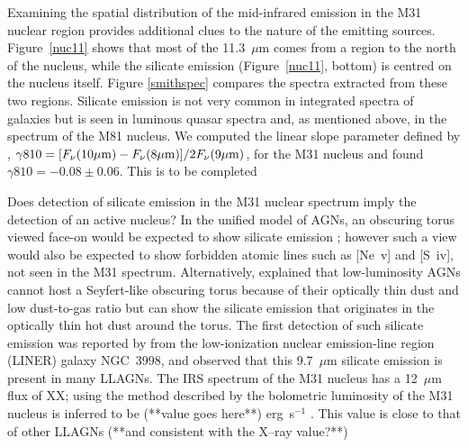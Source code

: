 Examining the spatial distribution of the mid-infrared emission in the M31 nuclear region provides additional clues
to the nature of the emitting sources. Figure~\ref{nuc11} shows that most of the 11.3~$\mu$m comes from a region to the
north of the nucleus, while the silicate emission (Figure~\ref{nuc11},  bottom) is centred on the nucleus itself.  
Figure \ref{smithspec} compares the spectra extracted from these two regions. %
Silicate emission is not very common in
integrated spectra of galaxies \citep{Spoon2007} but is seen in luminous quasar spectra \citep{Hill14} and, as mentioned above, in the
spectrum of the M81 nucleus. We computed the linear slope parameter  defined by \citet{Smith2010},
$\gamma810 =[F_{\nu}(10\mu{\rm m}) -F_{\nu}(8\mu{\rm m})]/2F_{\nu}(9\mu{\rm m}) $, for the M31 nucleus and
found $\gamma810 =-0.08\pm 0.06$.  This is  to be completed %

Does detection of silicate emission in the M31 nuclear spectrum imply the detection of an active nucleus?
In the unified model of AGNs, an obscuring torus viewed face-on would be expected to show silicate emission
\citep{AGNtypes1995, AGNref}; however such a view would also be expected to show forbidden atomic lines such as [Ne~{\sc v}] and [S~{\sc iv}],
not seen in the M31 spectrum. Alternatively, \citet{Mason2012} explained that low-luminosity AGNs cannot 
host a Seyfert-like obscuring torus because of their optically thin dust and low dust-to-gas ratio but can show
the silicate emission that originates in the optically thin hot dust around the torus.  The first detection of such silicate emission was 
reported by \citet{Sturm2005} from the low-ionization nuclear emission-line region (LINER) galaxy NGC~3998, and 
\citealt{Mason2012}  observed that this 9.7~$\mu$m silicate emission is present in many LLAGNs. 
The IRS spectrum of the M31 nucleus has a 12~$\mu$m flux  of XX; using the method described by \citet{luminosity}
the  bolometric luminosity of the M31 nucleus is inferred to be (**value goes here**) erg~s$^{-1}$ .
 This value is close to that of other LLAGNs (**and consistent with the X--ray value?**)
